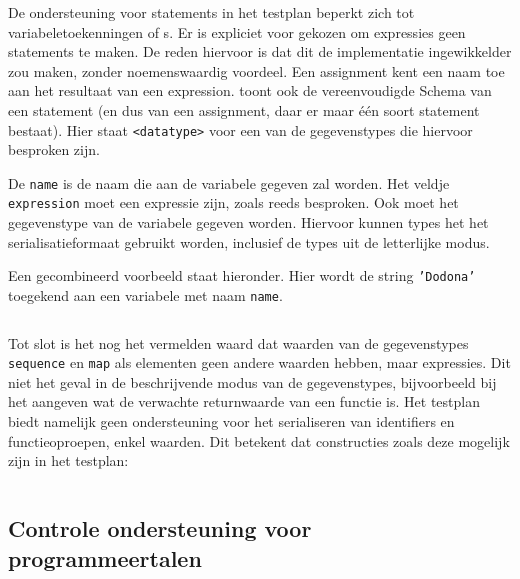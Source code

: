 De ondersteuning voor statements in het testplan beperkt zich tot variabeletoekenningen of s.
Er is expliciet voor gekozen om expressies geen statements te maken.
De reden hiervoor is dat dit de implementatie ingewikkelder zou maken, zonder noemenswaardig voordeel.
Een assignment kent een naam toe aan het resultaat van een expression.
 toont ook de vereenvoudigde  Schema van een statement (en dus van een assignment, daar er maar één soort statement bestaat).
Hier staat \texttt{<datatype>} voor een van de gegevenstypes die hiervoor besproken zijn.

De \texttt{name} is de naam die aan de variabele gegeven zal worden.
Het veldje \texttt{expression} moet een expressie zijn, zoals reeds besproken.
Ook moet het gegevenstype van de variabele gegeven worden.
Hiervoor kunnen types het het serialisatieformaat gebruikt worden, inclusief de types uit de letterlijke modus.

Een gecombineerd voorbeeld staat hieronder.
Hier wordt de string \texttt{'Dodona'} toegekend aan een variabele met naam \texttt{name}.

\inputminted{json}{code/assign-variable.json}

Tot slot is het nog het vermelden waard dat waarden van de gegevenstypes \texttt{sequence} en \texttt{map} als elementen geen andere waarden hebben, maar expressies.
Dit niet het geval in de beschrijvende modus van de gegevenstypes, bijvoorbeeld bij het aangeven wat de verwachte returnwaarde van een functie is.
Het testplan biedt namelijk geen ondersteuning voor het serialiseren van identifiers en functieoproepen, enkel waarden.
Dit betekent dat constructies zoals deze mogelijk zijn in het testplan:

\inputminted{java}{code/advanced.jshell}

\subsection{Controle ondersteuning voor programmeertalen}\label{subsec:vereiste-functies}


